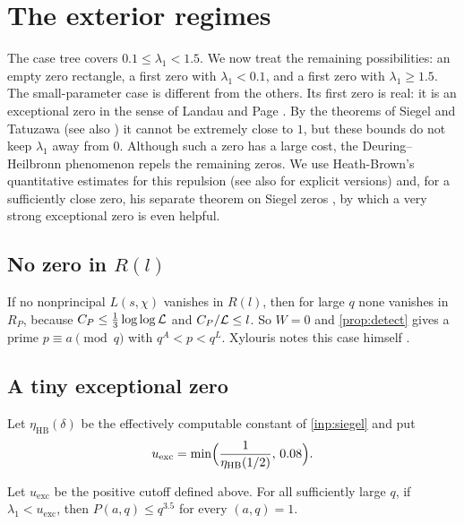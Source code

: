\section{The exterior regimes}\label{sec:exteriors}

The case tree covers $0.1\le\lambda_1<1.5$. We now treat the remaining possibilities:
an empty zero rectangle, a first zero with $\lambda_1<0.1$, and a first zero with
$\lambda_1\ge1.5$. The small-parameter case is different from the others. Its first
zero is real: it is an exceptional zero in the sense of Landau and Page
\cite{Landau1918imaginar,Page1935number}. By the theorems of Siegel and Tatuzawa
\cite{Siegel1935classenzahl,Tatuzawa1951theorem} (see also
\cite{Pintz1977elementaryV,Pintz1977elementaryVIII}) it cannot be extremely close to $1$, but these
bounds do not keep $\lambda_1$ away from $0$. Although such a zero has a large cost, the
Deuring--Heilbronn phenomenon \cite{Deuring1933imaginare,Heilbronn1934class,Linnik1944deuring}
repels the remaining zeros. We use Heath-Brown's quantitative estimates for this repulsion (see
also \cite{BenliGoelTwissZaman2026explicit} for explicit versions) and, for a sufficiently close
zero, his separate theorem on Siegel zeros \cite{HeathBrown1990siegel}, by which a very strong
exceptional zero is even helpful.

\subsection{No zero in \texorpdfstring{$R(l)$}{R(l)}}
If no nonprincipal $L(s,\chi)$ vanishes in $R(l)$, then for large $q$ none vanishes in $R_P$, because
$C_P\le\frac13\log\log\mathcal{L}$ and $C_P/\mathcal{L}\le l$. So $W=0$ and \cref{prop:detect} gives a prime $p\equiv
a\pmod q$ with $q^A<p<q^L$. Xylouris notes this case himself \cite[p.~36]{Xylouris2011nullstellen}.

\subsection{A tiny exceptional zero}
Let $\eta_{\mathrm{HB}}(\delta)$ be the effectively computable constant of \cref{inp:siegel} and put
\[
  u_{\mathrm{exc}}=\min\Bigl(\frac1{\eta_{\mathrm{HB}}(1/2)},\,0.08\Bigr).
\]

\begin{proposition}\label{prop:tiny}
Let $u_{\mathrm{exc}}$ be the positive cutoff defined above. For all sufficiently large
$q$, if $\lambda_1<u_{\mathrm{exc}}$, then $P(a,q)\le q^{3.5}$ for every $(a,q)=1$.
\end{proposition}

